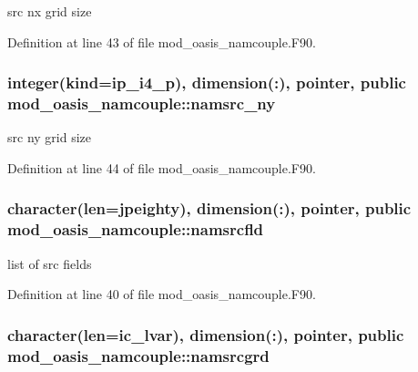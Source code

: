 src nx grid size 



Definition at line 43 of file mod\+\_\+oasis\+\_\+namcouple.\+F90.

\hypertarget{classmod__oasis__namcouple_ab82c80f007b37865172ddb033a1abb36}{
\subsubsection[{namsrc\+\_\+ny}]{\setlength{\rightskip}{0pt plus 5cm}integer(kind=ip\+\_\+i4\+\_\+p), dimension(\+:), pointer, public mod\+\_\+oasis\+\_\+namcouple\+::namsrc\+\_\+ny}}\label{classmod__oasis__namcouple_ab82c80f007b37865172ddb033a1abb36}


src ny grid size 



Definition at line 44 of file mod\+\_\+oasis\+\_\+namcouple.\+F90.

\hypertarget{classmod__oasis__namcouple_a5fcb5a4f2a49f414fafe38b03c5c089d}{
\subsubsection[{namsrcfld}]{\setlength{\rightskip}{0pt plus 5cm}character(len={\bf jpeighty}), dimension(\+:), pointer, public mod\+\_\+oasis\+\_\+namcouple\+::namsrcfld}}\label{classmod__oasis__namcouple_a5fcb5a4f2a49f414fafe38b03c5c089d}


list of src fields 



Definition at line 40 of file mod\+\_\+oasis\+\_\+namcouple.\+F90.

\hypertarget{classmod__oasis__namcouple_a589c1bae58b10bcb0cfb30c0893a7895}{
\subsubsection[{namsrcgrd}]{\setlength{\rightskip}{0pt plus 5cm}character(len=ic\+\_\+lvar), dimension(\+:), pointer, public mod\+\_\+oasis\+\_\+namcouple\+::namsrcgrd}}\label{classmod__oasis__namcouple_a589c1bae58b10bcb0cfb30c0893a7895}


